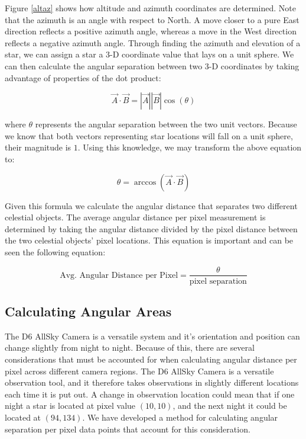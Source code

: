 Figure \ref{altaz} shows how altitude and azimuth coordinates are determined. 
Note that the azimuth is an angle with respect to North.
A move closer to a pure East direction reflects a positive azimuth angle, whereas a move in the West direction reflects a negative azimuth angle.
Through finding the azimuth and elevation of a star, we can assign a star a 3-D coordinate value that lays on a unit sphere.  
We can then calculate the angular separation between two 3-D coordinates by taking advantage of properties of the dot product:

$$ \vec{A} \cdot \vec{B} = |\vec{A}||\vec{B}| \cos{(\theta)} $$

where $\theta$ represents the angular separation between the two unit vectors.  
Because we know that both vectors representing star locations will fall on a unit sphere, their magnitude is $1$.
Using this knowledge, we may transform the above equation to:

$$ \theta = \arccos{(\vec{A} \cdot \vec{B})} $$

Given this formula we calculate the angular distance that separates two different celestial objects.
The average angular distance per pixel measurement is determined by taking the angular distance divided by the pixel distance between the two celestial objects' pixel locations.
This equation is important and can be seen the following equation:

$$ \textrm{Avg. Angular Distance per Pixel} = \frac{\theta}{\textrm{pixel separation}} $$




\subsection{Calculating Angular Areas}

The D6 AllSky Camera is a versatile system and it's orientation and position can change slightly from night to night.
Because of this, there are several considerations that must be accounted for when calculating angular distance per pixel across different camera regions.
The D6 AllSky Camera is a versatile observation tool, and it therefore takes observations in slightly different locations each time it is put out.
A change in observation location could mean that if one night a star is located at pixel value $(10,10)$, and the next night it could be located at $(94,134)$.
We have developed a method for calculating angular separation per pixel data points that account for this consideration.

